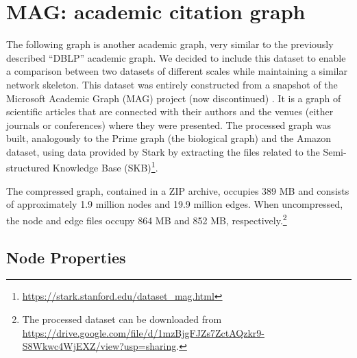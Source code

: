 \section{MAG: academic citation graph}

The following graph is another academic graph, very similar to the previously described ``DBLP'' academic graph. We decided to include this dataset to enable a comparison between two datasets of different scales while maintaining a similar network skeleton. This dataset was entirely constructed from a snapshot of the Microsoft Academic Graph (MAG) project (now discontinued) \cite{wang2020macademic, sinha2015overview}. It is a graph of scientific articles that are connected with their authors and the venues (either journals or conferences) where they were presented. The processed graph was built, analogously to the Prime graph (the biological graph) and the Amazon dataset, using data provided by Stark \cite{stark2024} by extracting the files related to the Semi-structured Knowledge Base (SKB)\footnote{\url{https://stark.stanford.edu/dataset_mag.html}}.

The compressed graph, contained in a ZIP archive, occupies 389 MB and consists of approximately 1.9 million nodes and 19.9 million edges. When uncompressed, the node and edge files occupy 864 MB and 852 MB, respectively.\footnote{The processed dataset can be downloaded from \url{https://drive.google.com/file/d/1mzBjgFJZs7ZctAQzkr9-S8Wkwc4WjEXZ/view?usp=sharing}.}

\subsection*{Node Properties}

